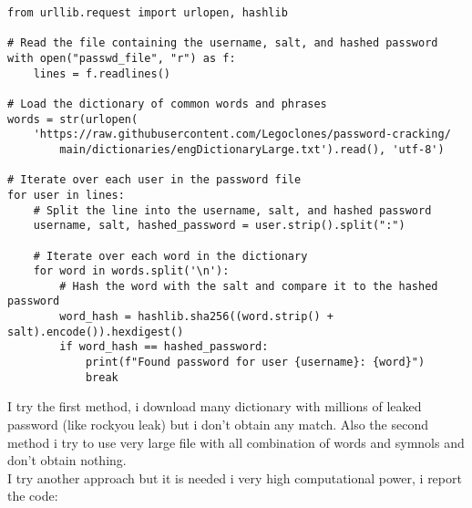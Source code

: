 \documentclass{article}
\begin{document}
\begin{lstlisting}
from urllib.request import urlopen, hashlib

# Read the file containing the username, salt, and hashed password
with open("passwd_file", "r") as f:
    lines = f.readlines()

# Load the dictionary of common words and phrases
words = str(urlopen(
    'https://raw.githubusercontent.com/Legoclones/password-cracking/
        main/dictionaries/engDictionaryLarge.txt').read(), 'utf-8')

# Iterate over each user in the password file
for user in lines:
    # Split the line into the username, salt, and hashed password
    username, salt, hashed_password = user.strip().split(":")

    # Iterate over each word in the dictionary
    for word in words.split('\n'):
        # Hash the word with the salt and compare it to the hashed password
        word_hash = hashlib.sha256((word.strip() + salt).encode()).hexdigest()
        if word_hash == hashed_password:
            print(f"Found password for user {username}: {word}")
            break

\end{lstlisting}
I try the first method, i download many dictionary with millions of leaked password (like rockyou leak) but i don't obtain any match. Also the second method i try to use very large file with all combination of words and symnols and don't obtain nothing.\\
I try another approach but it is needed i very high computational power, i report the code:
\end{document}
